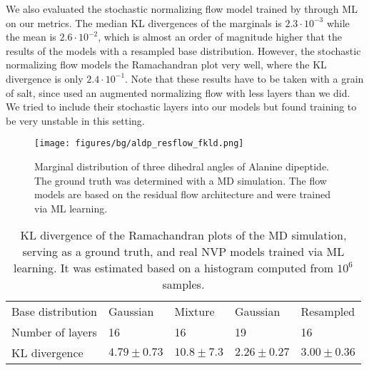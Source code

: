 \documentclass[twoside]{article}
\begin{document}
We also evaluated the stochastic normalizing flow model trained by \cite{Wu2020} through ML on our metrics. The median KL divergences of the marginals is $2.3\cdot10^{-3}$ while the mean is $2.6\cdot10^{-2}$, which is almost an order of magnitude higher that the results of the models with a resampled base distribution. However, the stochastic normalizing flow models the Ramachandran plot very well, where the KL divergence is only $2.4\cdot10^{-1}$. Note that these results have to be taken with a grain of salt, since \cite{Wu2020} used an augmented normalizing flow with less layers than we did. We tried to include their stochastic layers into our models but found training to be very unstable in this setting.

\begin{figure}[h]
    \centering
    \texttt{[image: figures/bg/aldp\_resflow\_fkld.png]}
    \caption{Marginal distribution of three dihedral angles of Alanine dipeptide. The ground truth was determined with a MD simulation. The flow models are based on the residual flow architecture and were trained via ML learning.}
    \label{fig:aldp_resflow_fkld}
\end{figure}

\begin{table}[h]
  \caption{KL divergence of the Ramachandran plots of the MD simulation, serving as a ground truth, and real NVP models trained via ML learning. It was estimated based on a histogram computed from $10^6$ samples.}
  \label{tab:kld_ramachandran_rnvp_fkld}
  \centering
  \vspace{0.3cm}
  \begin{tabular}{l|llll}
    Base distribution & Gaussian & Mixture & Gaussian & Resampled \\
    Number of layers & 16 & 16 & 19 & 16  \\
    \hline
    KL divergence & $4.79\pm0.73$ & $10.8\pm7.3$ & $\mathbf{2.26\pm0.27}$ & $3.00\pm0.36$ 
  \end{tabular}
\end{table}
\end{document}
